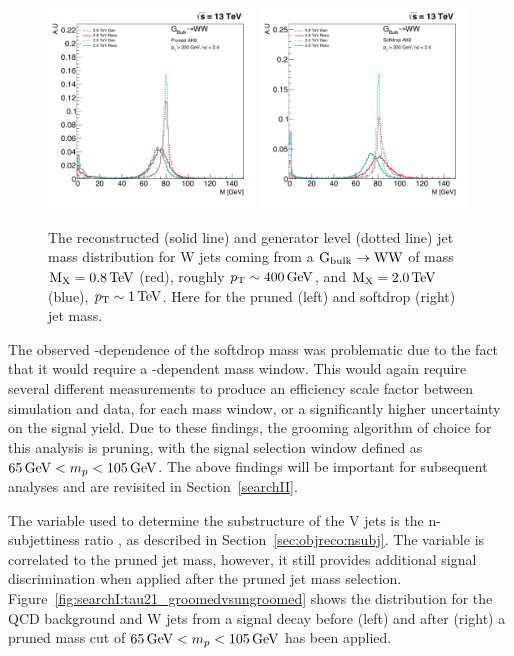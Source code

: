 \begin{figure}[h!]
\centering
\includegraphics[width=0.49\textwidth]{figures/analysis/search1/misc/pruned_mass_shift_genvsreco.pdf}
\includegraphics[width=0.49\textwidth]{figures/analysis/search1/misc/softdrop_mass_shift_genvsreco.pdf}
\caption{The reconstructed (solid line) and generator level (dotted line) jet mass distribution for W jets coming from a $\mathrm{G}_\mathrm{bulk} \rightarrow \mathrm{W}\mathrm{W}$ of mass $\text{M}_{\text{X}} = 0.8 \,\text{Te\hspace{-.08em}V}$ (red), roughly $p_{\mathrm{T}}\sim 400 \,\text{Ge\hspace{-.08em}V}$, and $\text{M}_{\text{X}} = 2.0 \,\text{Te\hspace{-.08em}V}$ (blue), $p_{\mathrm{T}}\sim 1 \,\text{Te\hspace{-.08em}V}$. Here for the pruned (left) and softdrop (right) jet mass.}
\label{fig:searchI:grommedmassshift_genvsreco}
\end{figure}
The observed \PT-dependence of the softdrop mass was problematic due to the fact that it would require a \PT-dependent mass window. This would again require several different measurements to produce an efficiency scale factor between simulation and data, for each mass window, or a significantly higher uncertainty on the signal yield. Due to these findings, the grooming algorithm of choice for this analysis is pruning, with the signal selection window defined as $65 \,\text{Ge\hspace{-.08em}V} < m_{p} < 105 \,\text{Ge\hspace{-.08em}V}$. The above findings will be important for subsequent analyses and are revisited in Section~\ref{searchII}.\par
The variable used to determine the substructure of the V jets is the n-subjettiness ratio \nsubj, as described in Section~\ref{sec:objreco:nsubj}. The \nsubj variable is correlated to the pruned jet mass, however, it still provides additional signal discrimination when applied after the pruned jet mass selection. Figure~\ref{fig:searchI:tau21_groomedvsungroomed} shows the \nsubj distribution for the QCD background and W jets from a signal decay before (left) and after (right) a pruned mass cut of $65 \,\text{Ge\hspace{-.08em}V} < m_{p} < 105 \,\text{Ge\hspace{-.08em}V}$ has been applied.
